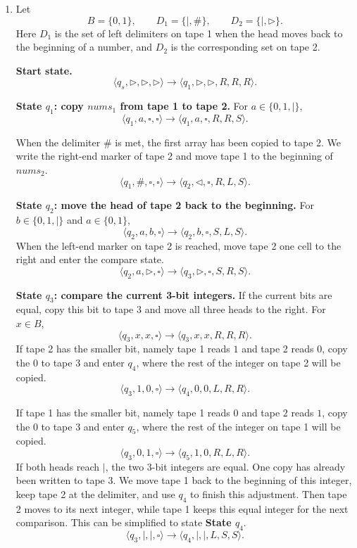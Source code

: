 \documentclass[12pt,a4paper]{article}
\makeatletter
\newtheorem*{solution}{Solution}
\theoremstyle{definition}
\renewenvironment{solution}[1][Solution] {\par\pushQED{\qed}\normalfont\topsep6\p@\@plus6\p@\relax\trivlist\item[\hskip\labelsep\bfseries#1\@addpunct{.}]\ignorespaces}{\popQED\endtrivlist\@endpefalse} \makeatother
\makeatother
\begin{document}
\begin{enumerate}
\begin{solution}
\begin{enumerate}
            Let \[ B=\{0,1\}, \qquad D_1=\{\vert,\#\}, \qquad D_2=\{\vert,\triangleright\}. \] Here \(D_1\) is the set of left delimiters on tape 1 when the head moves back to the beginning of a number, and \(D_2\) is the corresponding set on tape 2.

            \medskip \noindent\textbf{Start state.} \[ \langle q_s,\triangleright,\triangleright,\triangleright\rangle \to \langle q_1,\triangleright,\triangleright,R,R,R\rangle . \]

            \medskip 
            \noindent\textbf{State \(q_1\): copy \(nums_1\) from tape 1 to tape 2.} 
            For \(a\in\{0,1,\vert\}\), \[ \langle q_1,a,\square,\square\rangle \to \langle q_1,a,\square,R,R,S\rangle . \]

            When the delimiter \(\#\) is met, the first array has been copied to tape 2. We write the right-end marker of tape 2 and move tape 1 to the beginning of \(nums_2\). \[ \langle q_1,\#, \square,\square\rangle \to \langle q_2,\triangleleft,\square,R,L,S\rangle . \]

            \medskip \noindent\textbf{State \(q_2\): move the head of tape 2 back to the beginning.} For \(b\in\{0,1,\vert\}\) and \(a\in\{0,1\}\), \[ \langle q_2,a,b,\square\rangle \to \langle q_2,b,\square,S,L,S\rangle . \] When the left-end marker on tape 2 is reached, move tape 2 one cell to the right and enter the compare state. \[ \langle q_2,a,\triangleright,\square\rangle \to \langle q_3,\triangleright,\square,S,R,S\rangle . \]


            \medskip \noindent\textbf{State \(q_3\): compare the current 3-bit integers.} If the current bits are equal, copy this bit to tape 3 and move all three heads to the right. For \(x\in B\), \[ \langle q_3,x,x,\square\rangle \to \langle q_3,x,x,R,R,R\rangle . \] If tape 2 has the smaller bit, namely tape 1 reads \(1\) and tape 2 reads \(0\), copy the \(0\) to tape 3 and enter \(q_4\), where the rest of the integer on tape 2 will be copied. \[ \langle q_3,1,0,\square\rangle \to \langle q_4,0,0,L,R,R\rangle . \]

            If tape 1 has the smaller bit, namely tape 1 reads \(0\) and tape 2 reads \(1\), copy the \(0\) to tape 3 and enter \(q_5\), where the rest of the integer on tape 1 will be copied. \[ \langle q_3,0,1,\square\rangle \to \langle q_5,1,0,R,L,R\rangle . \] If both heads reach \(\vert\), the two 3-bit integers are equal. One copy has already been written to tape 3. We move tape 1 back to the beginning of this integer, keep tape 2 at the delimiter, and use \(q_4\) to finish this adjustment. Then tape 2 moves to its next integer, while tape 1 keeps this equal integer for the next comparison. This can be simplified to state \textbf{State \(q_4\)}. \[ \langle q_3,\vert,\vert,\square\rangle \to \langle q_4,\vert,\vert,L,S,S\rangle . \]


\end{enumerate}
\end{solution}
\end{enumerate}
\end{document}

